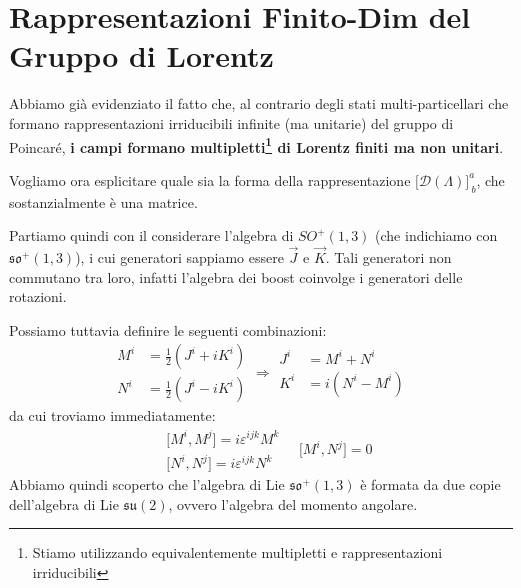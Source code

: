 \documentclass[../main.tex]{subfiles}
\begin{document}
\section{Rappresentazioni Finito-Dim del Gruppo di Lorentz}
Abbiamo già evidenziato il fatto che, al contrario degli stati multi-particellari che formano rappresentazioni irriducibili infinite (ma unitarie) del gruppo di Poincaré, \textbf{i campi formano multipletti\footnote{Stiamo utilizzando equivalentemente multipletti e rappresentazioni irriducibili} di Lorentz finiti ma non unitari}.

Vogliamo ora esplicitare quale sia la forma della rappresentazione $\big[\mathscr D(\Lambda)\big]^a_{~b}$, che sostanzialmente è una matrice.

Partiamo quindi con il considerare l'algebra di $SO^+(1,3)$ (che indichiamo con $\mathfrak{so}^+(1,3)$), i cui generatori sappiamo essere $\Vec{J}$ e $\Vec{K}$. Tali generatori non commutano tra loro, infatti l'algebra dei boost coinvolge i generatori delle rotazioni.

Possiamo tuttavia definire le seguenti combinazioni:
\begin{equation}
    \boxed{
    \begin{aligned}
        M^i &= \frac{1}{2}(J^i+iK^i) \\
        N^i &= \frac{1}{2}(J^i-iK^i)   
    \end{aligned}}
    \Rightarrow
    \begin{aligned}
        J^i &=M^i+N^i \\
        K^i &= i(N^i-M^i)   
    \end{aligned}
    \label{eq:MandN_definition}
\end{equation}
da cui troviamo immediatamente:
\begin{equation}
    \boxed{
    \begin{aligned}
        &\big[M^i,M^j\big] = i\varepsilon^{ijk}M^k \\
        &\big[N^i,N^j\big] = i\varepsilon^{ijk}N^k
    \end{aligned}
    \quad \big[M^i,N^j\big] =0
    }
    \label{eq:MandN_commrel}
\end{equation}
Abbiamo quindi scoperto che l'algebra di Lie $\mathfrak{so}^+(1,3)$ è formata da due copie dell'algebra di Lie $\mathfrak{su}(2)$, ovvero l'algebra del momento angolare.
\end{document}
